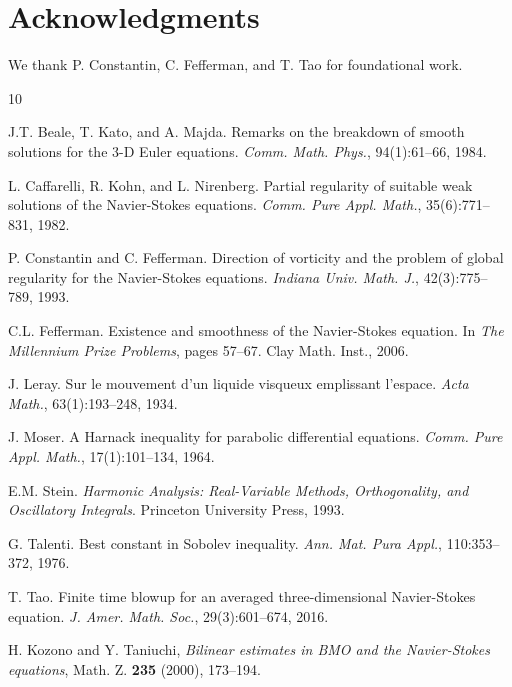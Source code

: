 \documentclass[12pt]{article}
\begin{document}
\section*{Acknowledgments}

We thank P. Constantin, C. Fefferman, and T. Tao for foundational work.


\begin{thebibliography}{10}

J.T. Beale, T. Kato, and A. Majda.
\newblock Remarks on the breakdown of smooth solutions for the 3-D Euler equations.
\newblock \emph{Comm. Math. Phys.}, 94(1):61--66, 1984.

L. Caffarelli, R. Kohn, and L. Nirenberg.
\newblock Partial regularity of suitable weak solutions of the Navier-Stokes equations.
\newblock \emph{Comm. Pure Appl. Math.}, 35(6):771--831, 1982.

P. Constantin and C. Fefferman.
\newblock Direction of vorticity and the problem of global regularity for the Navier-Stokes equations.
\newblock \emph{Indiana Univ. Math. J.}, 42(3):775--789, 1993.

C.L. Fefferman.
\newblock Existence and smoothness of the Navier-Stokes equation.
\newblock In \emph{The Millennium Prize Problems}, pages 57--67. Clay Math. Inst., 2006.

J. Leray.
\newblock Sur le mouvement d'un liquide visqueux emplissant l'espace.
\newblock \emph{Acta Math.}, 63(1):193--248, 1934.

J. Moser.
\newblock A Harnack inequality for parabolic differential equations.
\newblock \emph{Comm. Pure Appl. Math.}, 17(1):101--134, 1964.

E.M. Stein.
\newblock \emph{Harmonic Analysis: Real-Variable Methods, Orthogonality, and Oscillatory Integrals}.
\newblock Princeton University Press, 1993.

G. Talenti.
\newblock Best constant in Sobolev inequality.
\newblock \emph{Ann. Mat. Pura Appl.}, 110:353--372, 1976.

T. Tao.
\newblock Finite time blowup for an averaged three-dimensional Navier-Stokes equation.
\newblock \emph{J. Amer. Math. Soc.}, 29(3):601--674, 2016.

 H. Kozono and Y. Taniuchi, \emph{Bilinear estimates in BMO and the Navier-Stokes equations}, Math. Z. \textbf{235} (2000), 173--194.


\end{thebibliography}
\end{document}
